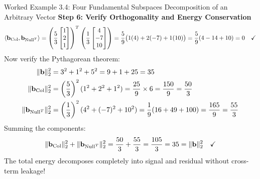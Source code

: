 \begin{examplebox}{Worked Example 3.4: Four Fundamental Subspaces Decomposition of an Arbitrary Vector}
\textbf{Step 6: Verify Orthogonality and Energy Conservation}
\begin{equation*}
\langle \mathbf{b}_{\operatorname{Col}}, \mathbf{b}_{\operatorname{Null}^T} \rangle = \left( \frac{5}{3} \begin{bmatrix} 1 \\ 2 \\ 1 \end{bmatrix} \right)^T \left( \frac{1}{3} \begin{bmatrix} 4 \\ -7 \\ 10 \end{bmatrix} \right) = \frac{5}{9}\big( 1(4) + 2(-7) + 1(10) \big) = \frac{5}{9}(4 - 14 + 10) = 0 \quad \checkmark
\end{equation*}
Now verify the Pythagorean theorem:
\begin{align*}
\|\mathbf{b}\|_2^2 &= 3^2 + 1^2 + 5^2 = 9 + 1 + 25 = 35 \\
\|\mathbf{b}_{\operatorname{Col}}\|_2^2 &= \left(\frac{5}{3}\right)^2 (1^2 + 2^2 + 1^2) = \frac{25}{9} \times 6 = \frac{150}{9} = \frac{50}{3} \\
\|\mathbf{b}_{\operatorname{Null}^T}\|_2^2 &= \left(\frac{1}{3}\right)^2 (4^2 + (-7)^2 + 10^2) = \frac{1}{9}(16 + 49 + 100) = \frac{165}{9} = \frac{55}{3}
\end{align*}
Summing the components:
\begin{equation*}
\|\mathbf{b}_{\operatorname{Col}}\|_2^2 + \|\mathbf{b}_{\operatorname{Null}^T}\|_2^2 = \frac{50}{3} + \frac{55}{3} = \frac{105}{3} = 35 = \|\mathbf{b}\|_2^2 \quad \checkmark
\end{equation*}
The total energy decomposes completely into signal and residual without cross-term leakage!
\end{examplebox}

